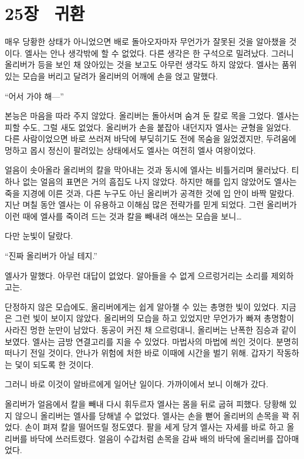 

\chapter[25장  귀환][25장\hspace*{.5em}귀환]{25장 \ 귀환}



매우 당황한 상태가 아니었으면 배로 돌아오자마자 무언가가 잘못된 것을 알아챘을 것이다. 엘사는 안나 생각밖에 할 수 없었다. 다른 생각은 한 구석으로 밀려났다. 그러니 올리버가 등을 보인 채 앉아있는 것을 보고도 아무런 생각도 하지 않았다. 엘사는 품위 있는 모습을 버리고 달려가 올리버의 어깨에 손을 얹고 말했다.

``어서 가야 해—''

본능은 마음을 따라 주지 않았다. 올리버는 돌아서며 숨겨 둔 칼로 목을 그었다. 엘사는 피할 수도, 그럴 새도 없었다. 올리버가 손을 붙잡아 내던지자 엘사는 균형을 잃었다. 다른 사람이었으면 바로 쓰러져 바닥에 부딪히기도 전에 목숨을 잃었겠지만, 두려움에 멍하고 몹시 정신이 팔려있는 상태에서도 엘사는 여전히 엘사 여왕이었다.

얼음이 솟아올라 올리버의 칼을 막아내는 것과 동시에 엘사는 비틀거리며 물러났다. 티 하나 없는 얼음의 표면은 거의 흠집도 나지 않았다. 하지만 해를 입지 않았어도 엘사는 죽을 지경에 이른 것과, 다른 누구도 아닌 올리버가 공격한 것에 입 안이 바짝 말랐다. 지난 며칠 동안 엘사는 이 유용하고 이해심 많은 전략가를 믿게 되었다. 그런 올리버가 이런 때에 엘사를 죽이려 드는 것과 칼을 빼내려 애쓰는 모습을 보니\ldots

다만 눈빛이 달랐다.

``진짜 올리버가 아닐 테지.''

엘사가 말했다. 아무런 대답이 없었다. 알아들을 수 없게 으르렁거리는 소리를 제외하고는.

단정하지 않은 모습에도, 올리버에게는 쉽게 알아챌 수 있는 총명한 빛이 있었다. 지금은 그런 빛이 보이지 않았다. 올리버의 모습을 하고 있었지만 무언가가 빠져 총명함이 사라진 멍한 눈만이 남았다. 동공이 커진 채 으르렁대니, 올리버는 난폭한 짐승과 같이 보였다. 엘사는 금방 연결고리를 지을 수 있었다. 마법사의 마법에 씌인 것이다. 분명히 떠나기 전일 것이다, 안나가 위험에 처한 바로 이때에 시간을 벌기 위해. 갑자기 작동하는 덫이 되도록 한 것이다.

그러니 바로 이것이 알바르에게 일어난 일이다. 가까이에서 보니 이해가 갔다.

올리버가 얼음에서 칼을 빼내 다시 휘두르자 엘사는 몸을 뒤로 굽혀 피했다. 당황해 있지 않으니 올리버는 엘사를 당해낼 수 없었다. 엘사는 손을 뻗어 올리버의 손목을 꽉 쥐었다. 손이 펴져 칼을 떨어뜨릴 정도였다. 팔을 세게 당겨 엘사는 자세를 바로 하고 올리버를 바닥에 쓰러트렸다. 얼음이 수갑처럼 손목을 감싸 배의 바닥에 올리버를 잡아매었다.


